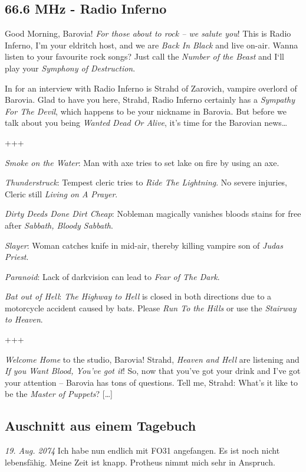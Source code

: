 \documentclass[final]{multiversum}
\begin{document}

\subsection{66.6 MHz - Radio Inferno}
Good Morning, Barovia! \textit{For those about to rock – we salute you}! This is Radio Inferno, I’m your eldritch host, and we are \textit{Back In Black} and live on-air. Wanna listen to your favourite rock songs? Just call the \textit{Number of the Beast} and I‘ll play your \textit{Symphony of Destruction}.

In for an interview with Radio Inferno is Strahd of Zarovich, vampire overlord of Barovia. Glad to have you here, Strahd, Radio Inferno certainly has a \textit{Sympathy For The Devil}, which happens to be your nickname in Barovia. But before we talk about you being \textit{Wanted Dead Or Alive}, it’s time for the Barovian news…

\centerline { +++ }

\textit{Smoke on the Water}: Man with axe tries to set lake on fire by using an axe.

\textit{Thunderstruck}: Tempest cleric tries to \textit{Ride The Lightning}. No severe injuries, Cleric still \textit{Living on A Prayer}.

\textit{Dirty Deeds Done Dirt Cheap}: Nobleman magically vanishes bloods stains for free after \textit{Sabbath, Bloody Sabbath}.

\textit{Slayer}: Woman catches knife in mid-air, thereby killing vampire son of \textit{Judas Priest}.

\textit{Paranoid}: Lack of darkvision can lead to \textit{Fear of The Dark}.

\textit{Bat out of Hell}: \textit{The Highway to Hell} is closed in both directions due to a motorcycle accident caused by bats. Please \textit{Run To the Hills} or use the \textit{Stairway to Heaven}.

\centerline { +++ }

\textit{Welcome Home} to the studio, Barovia! Strahd, \textit{Heaven and Hell} are listening and \textit{If you Want Blood, You’ve got it}! So, now that you’ve got your drink and I’ve got your attention – Barovia has tons of questions. Tell me, Strahd: What's it like to be the \textit{Master of Puppets}? […]


\subsection{Auschnitt aus einem Tagebuch}
\textit{19. Aug. 2074} Ich habe nun endlich mit FO31 angefangen. Es ist noch nicht lebensfähig. Meine Zeit ist knapp.  Protheus nimmt mich sehr in Anspruch. 
\end{document}
